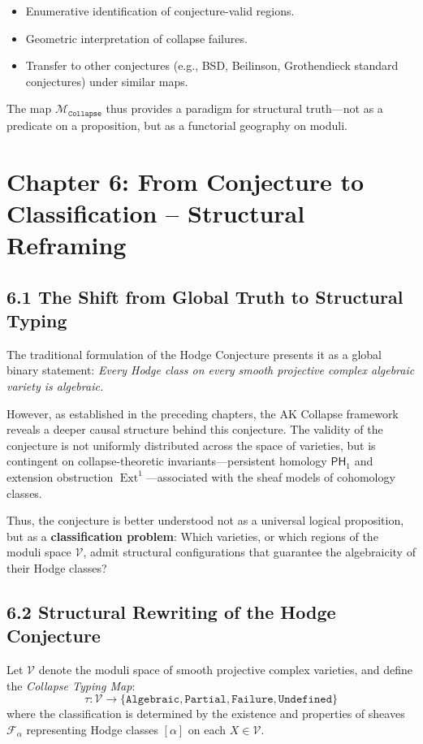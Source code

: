 \documentclass[11pt]{article}
\DeclareMathOperator{\Ext}{Ext}
\begin{document}
\begin{itemize}
  \item Enumerative identification of conjecture-valid regions.
  \item Geometric interpretation of collapse failures.
  \item Transfer to other conjectures (e.g., BSD, Beilinson, Grothendieck standard conjectures) under similar maps.
\end{itemize}

The map $\mathcal{M}_{\texttt{Collapse}}$ thus provides a paradigm for structural truth—not as a predicate on a proposition, but as a functorial geography on moduli.



\section{Chapter 6: From Conjecture to Classification – Structural Reframing}

\subsection{6.1 The Shift from Global Truth to Structural Typing}

The traditional formulation of the Hodge Conjecture presents it as a global binary statement:  
\emph{Every Hodge class on every smooth projective complex algebraic variety is algebraic.}

However, as established in the preceding chapters, the AK Collapse framework reveals a deeper causal structure behind this conjecture. The validity of the conjecture is not uniformly distributed across the space of varieties, but is contingent on collapse-theoretic invariants—persistent homology $\mathsf{PH}_1$ and extension obstruction $\Ext^1$—associated with the sheaf models of cohomology classes.

Thus, the conjecture is better understood not as a universal logical proposition, but as a \textbf{classification problem}:  
Which varieties, or which regions of the moduli space $\mathcal{V}$, admit structural configurations that guarantee the algebraicity of their Hodge classes?

\subsection{6.2 Structural Rewriting of the Hodge Conjecture}

Let $\mathcal{V}$ denote the moduli space of smooth projective complex varieties, and define the \emph{Collapse Typing Map}:
\[
\tau: \mathcal{V} \to \{ \texttt{Algebraic}, \texttt{Partial}, \texttt{Failure}, \texttt{Undefined} \}
\]
where the classification is determined by the existence and properties of sheaves $\mathcal{F}_\alpha$ representing Hodge classes $[\alpha]$ on each $X \in \mathcal{V}$.
\end{document}
